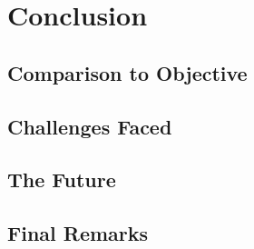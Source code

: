 \section{Conclusion}

\subsection{Comparison to Objective}

\subsection{Challenges Faced}

\subsection{The Future}

\subsection{Final Remarks}
